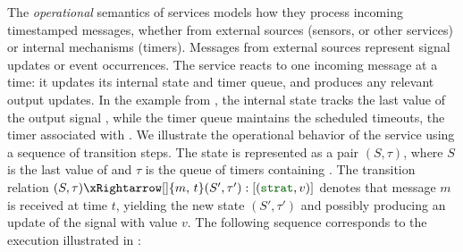 The \emph{operational} semantics of services models how they process incoming timestamped messages,
whether from external sources (\eg sensors, or other services) or internal mechanisms (timers).
Messages from external sources represent signal updates or event occurrences. The service reacts to
one incoming message at a time: it updates its internal state and timer queue, and produces any
relevant output updates.
%
In the \aeb example from , the internal state tracks the last value of the
output signal , while the timer queue maintains the scheduled timeouts, \ie the timer
 associated with .
%
We illustrate the operational behavior of the  service using a sequence of transition
steps. The state is represented as a pair $(S, \tau)$, where $S$ is the last value of  and
$\tau$ is the queue of timers containing . The transition relation
$(S, \tau) \xRightarrow[]{m,\,t} (S', \tau'): [(\idf{strat},v)]$ denotes that message $m$ is received
at time $t$, yielding the new state $(S', \tau')$ and possibly producing an update of the signal
 with value $v$. The following sequence corresponds to the execution illustrated in
:
